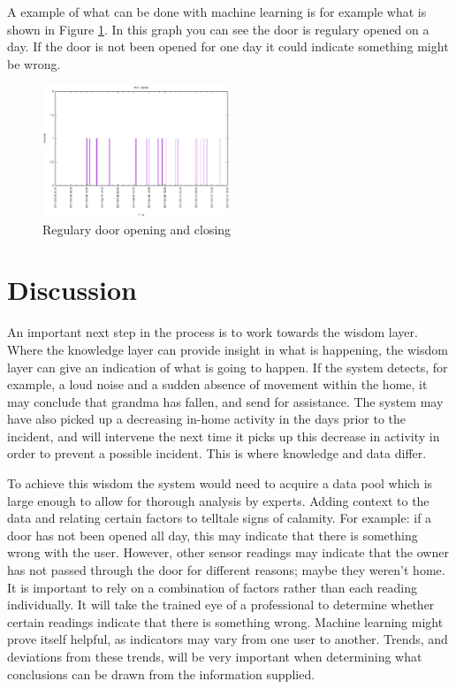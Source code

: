 \documentclass{below-ext}
\begin{document}
A example of what can be done with machine learning is for example what is shown in Figure \ref{fig:doorsensor2}. In this graph you can see the door is regulary opened on a day. If the door is not been opened for one day it could indicate something might be wrong.

\begin{figure}
\centering
\includegraphics[width=0.5\textwidth]{doorsensor2}
\caption{Regulary door opening and closing}
\label{fig:doorsensor2}
\end{figure}
\section{Discussion}
An important next step in the process is to work towards the wisdom layer. Where the knowledge layer can provide insight in what is happening, the wisdom layer can give an indication of what is going to happen. If the system detects, for example, a loud noise and a sudden absence of movement within the home, it may conclude that grandma has fallen, and send for assistance. The system may have also picked up a decreasing in-home activity in the days prior to the incident, and will intervene the next time it picks up this decrease in activity in order to prevent a possible incident. This is where knowledge and data differ. 

To achieve this wisdom the system would need to acquire a data pool which is large enough to allow for thorough analysis by experts. Adding context to the data and relating certain factors to telltale signs of calamity. For example: if a door has not been opened all day, this may indicate that there is something wrong with the user. However, other sensor readings may indicate that the owner has not passed through the door for different reasons; maybe they weren't home. It is important to rely on a combination of factors rather than each reading individually. It will take the trained eye of a professional to determine whether certain readings indicate that there is something wrong. Machine learning might prove itself helpful, as indicators may vary from one user to another. Trends, and deviations from these trends, will be very important when determining what conclusions can be drawn from the information supplied.  
\end{document}
